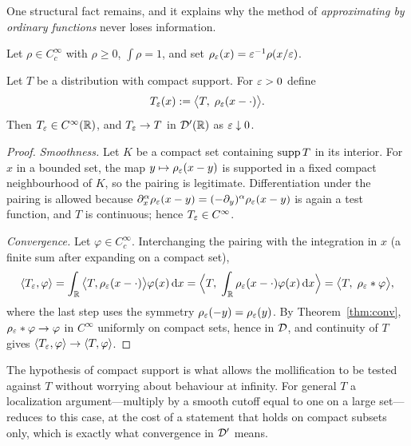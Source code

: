 One structural fact remains, and it explains why the method of \emph{approximating by ordinary
functions} never loses information.

Let $\rho\in C_{c}^{\infty}$ with $\rho\ge0$, $\int\rho=1$, and set
$\rho_{\varepsilon}(x)=\varepsilon^{-1}\rho(x/\varepsilon)$.

\begin{theorem}\label{thm:regularization}
Let $T$ be a distribution with compact support. For $\varepsilon>0$ define
\begin{equation}
T_{\varepsilon}(x):=\big\langle T,\;\rho_{\varepsilon}(x-\cdot)\big\rangle .
\label{eq:Teps}
\end{equation}
Then $T_{\varepsilon}\in C^{\infty}(\mathbb{R})$, and $T_{\varepsilon}\to T$ in $\mathcal{D}'(\mathbb{R})$ as $\varepsilon\downarrow0$.
\end{theorem}

\begin{proof}
\emph{Smoothness.} Let $K$ be a compact set containing $\operatorname{supp} T$ in its interior. For $x$ in a
bounded set, the map $y\mapsto\rho_{\varepsilon}(x-y)$ is supported in a fixed compact neighbourhood of $K$, so
the pairing is legitimate. Differentiation under the pairing is allowed because
$\partial_{x}^{\alpha}\rho_{\varepsilon}(x-y)=(-\partial_{y})^{\alpha}\rho_{\varepsilon}(x-y)$ is again a test
function, and $T$ is continuous; hence $T_{\varepsilon}\in C^{\infty}$.

\emph{Convergence.} Let $\varphi\in C_{c}^{\infty}$. Interchanging the pairing with the integration in
$x$ (a finite sum after expanding on a compact set),
\begin{equation}
\langle T_{\varepsilon},\varphi\rangle
=\int_{\mathbb{R}}\big\langle T,\rho_{\varepsilon}(x-\cdot)\big\rangle\varphi(x)\,\mathrm{d} x
=\Big\langle T,\;\int_{\mathbb{R}}\rho_{\varepsilon}(x-\cdot)\varphi(x)\,\mathrm{d} x\Big\rangle
=\big\langle T,\;\rho_{\varepsilon}*\varphi\big\rangle ,
\end{equation}
where the last step uses the symmetry $\rho_{\varepsilon}(-y)=\rho_{\varepsilon}(y)$. By
Theorem~\ref{thm:conv}, $\rho_{\varepsilon}*\varphi\to\varphi$ in $C^{\infty}$ uniformly on compact sets, hence
in $\mathcal{D}$, and continuity of $T$ gives $\langle T_{\varepsilon},\varphi\rangle\to\langle T,\varphi\rangle$.
\end{proof}

\begin{remark}
The hypothesis of compact support is what allows the mollification to be tested against $T$ without
worrying about behaviour at infinity. For general $T$ a localization argument---multiply by a smooth
cutoff equal to one on a large set---reduces to this case, at the cost of a statement that holds on
compact subsets only, which is exactly what convergence in $\mathcal{D}'$ means.
\end{remark}

